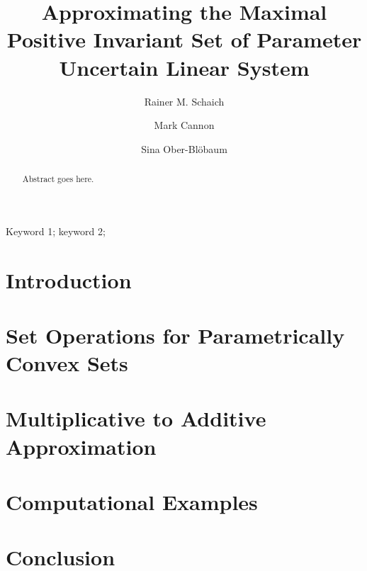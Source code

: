 \documentclass{ifacconf}
\begin{document}
\begin{frontmatter}

\title{Approximating the Maximal Positive Invariant Set of Parameter Uncertain Linear System}%


\author{Rainer M. Schaich} 
\author{Mark Cannon}
\author{Sina Ober-Bl\"obaum}


\address{Department of Engineering Science, University of Oxford, OX1 3PJ, UK. (e-mail: \{rainer.schaich,mark.cannon,sina.ober-blobaum\}@eng.ox.ac.uk).}


          
\begin{keyword}                           %
Keyword 1; keyword 2;
\end{keyword}                             %


\begin{abstract}                          %
Abstract goes here.
\end{abstract}

\end{frontmatter}


\section{Introduction}
%
%
\section{Set Operations for Parametrically Convex Sets}
%
%
\section{Multiplicative to Additive Approximation}

\section{Computational Examples}

\section{Conclusion}
\end{document}
